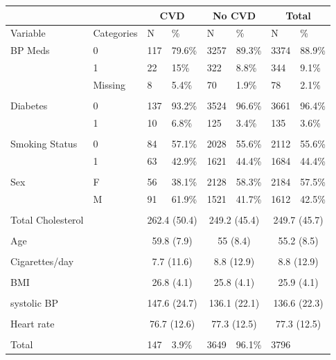 \documentclass{article}\usepackage[]{graphicx}\usepackage[]{color}
\begin{document}
\begin{table}[ht]
\centering
\begin{tabular}{llllllll}
& & \multicolumn{2}{c}{CVD}& \multicolumn{2}{c}{No CVD}& \multicolumn{2}{c}{Total}\\
  \hline
Variable & Categories & N & \% & N & \% & N & \% \\ 
   \hline
BP Meds & 0 & 117 & 79.6\% & 3257 & 89.3\% & 3374 & 88.9\% \\ 
   & 1 & 22 & 15\% & 322 & 8.8\% & 344 & 9.1\% \\ 
   & Missing & 8 & 5.4\% & 70 & 1.9\% & 78 & 2.1\% \\ 
   &  &  &  &  &  &  &  \\ 
  Diabetes & 0 & 137 & 93.2\% & 3524 & 96.6\% & 3661 & 96.4\% \\ 
   & 1 & 10 & 6.8\% & 125 & 3.4\% & 135 & 3.6\% \\ 
   &  &  &  &  &  &  &  \\ 
  Smoking Status & 0 & 84 & 57.1\% & 2028 & 55.6\% & 2112 & 55.6\% \\ 
   & 1 & 63 & 42.9\% & 1621 & 44.4\% & 1684 & 44.4\% \\ 
   &  &  &  &  &  &  &  \\ 
  Sex & F & 56 & 38.1\% & 2128 & 58.3\% & 2184 & 57.5\% \\ 
   & M & 91 & 61.9\% & 1521 & 41.7\% & 1612 & 42.5\% \\ 
   &  &  &  &  &  &  &  \\ 
  
Total Cholesterol &  & \multicolumn{2}{c}{262.4 (50.4)} & \multicolumn{2}{c}{249.2 (45.4)} & \multicolumn{2}{c}{249.7 (45.7)}\\
 &  &  &  &  &  &  & \\
Age &  & \multicolumn{2}{c}{59.8 (7.9)} & \multicolumn{2}{c}{55 (8.4)} & \multicolumn{2}{c}{55.2 (8.5)}\\
 &  &  &  &  &  &  & \\
Cigarettes/day &  & \multicolumn{2}{c}{7.7 (11.6)} & \multicolumn{2}{c}{8.8 (12.9)} & \multicolumn{2}{c}{8.8 (12.9)}\\
 &  &  &  &  &  &  & \\
BMI&  & \multicolumn{2}{c}{26.8 (4.1)} & \multicolumn{2}{c}{25.8 (4.1)} & \multicolumn{2}{c}{25.9 (4.1)}\\
 &  &  &  &  &  &  & \\
systolic BP &  & \multicolumn{2}{c}{147.6 (24.7)} & \multicolumn{2}{c}{136.1 (22.1)} & \multicolumn{2}{c}{136.6 (22.3)}\\
 &  &  &  &  &  &  & \\
Heart rate &  & \multicolumn{2}{c}{76.7 (12.6)} & \multicolumn{2}{c}{77.3 (12.5)} & \multicolumn{2}{c}{77.3 (12.5)}\\
 &  &  &  &  &  &  & \\
  \hline
Total &  & 147 & 3.9\% & 3649 & 96.1\% & 3796 &  \\ 
   \hline


\end{tabular}
\end{table}
\end{document}
